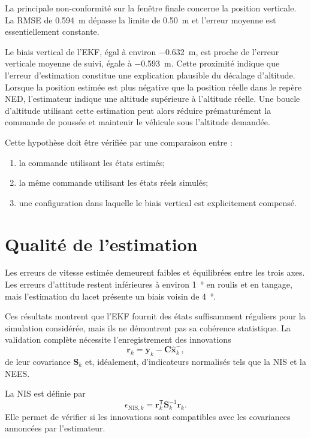 \documentclass[11pt,a4paper,oneside]{report}
\newcommand{\vect}[1]{\bm{#1}}
\newcommand{\trans}{^{\mathsf T}}
\begin{document}
La principale non-conformité sur la fenêtre finale concerne la position verticale. La RMSE de \SI{0.594}{m} dépasse la limite de \SI{0.50}{m} et l'erreur moyenne est essentiellement constante.

Le biais vertical de l'EKF, égal à environ \SI{-0.632}{m}, est proche de l'erreur verticale moyenne de suivi, égale à \SI{-0.593}{m}. Cette proximité indique que l'erreur d'estimation constitue une explication plausible du décalage d'altitude. Lorsque la position estimée est plus négative que la position réelle dans le repère NED, l'estimateur indique une altitude supérieure à l'altitude réelle. Une boucle d'altitude utilisant cette estimation peut alors réduire prématurément la commande de poussée et maintenir le véhicule sous l'altitude demandée.

Cette hypothèse doit être vérifiée par une comparaison entre :
\begin{enumerate}
	\item la commande utilisant les états estimés;
	\item la même commande utilisant les états réels simulés;
	\item une configuration dans laquelle le biais vertical est explicitement compensé.
\end{enumerate}

\section{Qualité de l'estimation}

Les erreurs de vitesse estimée demeurent faibles et équilibrées entre les trois axes. Les erreurs d'attitude restent inférieures à environ \SI{1}{\degree} en roulis et en tangage, mais l'estimation du lacet présente un biais voisin de \SI{4}{\degree}.

Ces résultats montrent que l'EKF fournit des états suffisamment réguliers pour la simulation considérée, mais ils ne démontrent pas sa cohérence statistique. La validation complète nécessite l'enregistrement des innovations
\begin{equation}
	\vect r_k
	=
	\vect y_k-\mathbf C\hat{\vect x}_k^{-},
\end{equation}
de leur covariance $\mathbf S_k$ et, idéalement, d'indicateurs normalisés tels que la NIS et la NEES.

La NIS est définie par
\begin{equation}
	\epsilon_{\mathrm{NIS},k}
	=
	\vect r_k\trans
	\mathbf S_k^{-1}
	\vect r_k.
	\label{eq_discussion_nis}
\end{equation}
Elle permet de vérifier si les innovations sont compatibles avec les covariances annoncées par l'estimateur.
\end{document}
